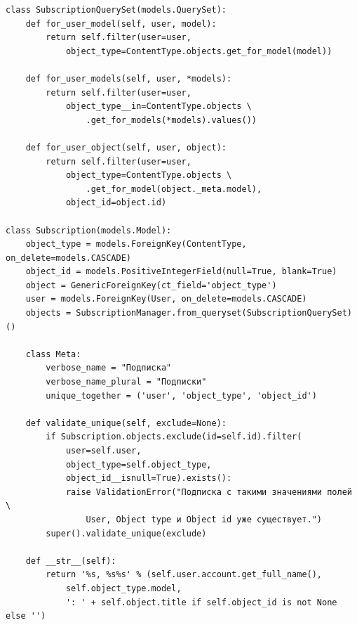 \documentclass[12pt, a4paper, oneside]{article}
\begin{document}
\begin{verbatim}
class SubscriptionQuerySet(models.QuerySet):
    def for_user_model(self, user, model):
        return self.filter(user=user, 
            object_type=ContentType.objects.get_for_model(model))

    def for_user_models(self, user, *models):
        return self.filter(user=user, 
            object_type__in=ContentType.objects \
                .get_for_models(*models).values())
    
    def for_user_object(self, user, object):
        return self.filter(user=user, 
            object_type=ContentType.objects \
                .get_for_model(object._meta.model),
            object_id=object.id)

class Subscription(models.Model):
    object_type = models.ForeignKey(ContentType, on_delete=models.CASCADE)
    object_id = models.PositiveIntegerField(null=True, blank=True)
    object = GenericForeignKey(ct_field='object_type')
    user = models.ForeignKey(User, on_delete=models.CASCADE)
    objects = SubscriptionManager.from_queryset(SubscriptionQuerySet)()

    class Meta:
        verbose_name = "Подписка"
        verbose_name_plural = "Подписки"
        unique_together = ('user', 'object_type', 'object_id')

    def validate_unique(self, exclude=None):
        if Subscription.objects.exclude(id=self.id).filter(
            user=self.user, 
            object_type=self.object_type, 
            object_id__isnull=True).exists():
            raise ValidationError("Подписка с такими значениями полей \
                User, Object type и Object id уже существует.")
        super().validate_unique(exclude)

    def __str__(self):
        return '%s, %s%s' % (self.user.account.get_full_name(), 
            self.object_type.model,
            ': ' + self.object.title if self.object_id is not None else '')
\end{verbatim}
\newpage
\end{document}
